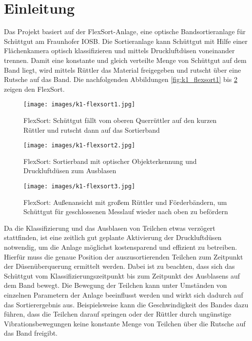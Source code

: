 \section{Einleitung}

Das Projekt basiert auf der FlexSort-Anlage, eine optische Bandsortieranlage für Schüttgut am Fraunhofer IOSB. Die Sortieranlage kann Schüttgut mit Hilfe einer Flächenkamera optisch klassifizieren und mittels Druckluftdüsen voneinander trennen. Damit eine konstante und gleich verteilte Menge von Schüttgut auf dem Band liegt, wird mittels Rüttler das Material freigegeben und rutscht über eine Rutsche auf das Band. Die nachfolgenden Abbildungen \ref{fig:k1_flexsort1} bis \ref{fig:k1_flexsort3} zeigen den FlexSort.

\begin{figure}[htb]
	\centering
	\begin{minipage}[t]{0.4\linewidth}
		\centering
		\texttt{[image: images/k1-flexsort1.jpg]}
		\caption{FlexSort: Schüttgut fällt vom oberen Querrüttler auf den kurzen Rüttler und rutscht dann auf das Sortierband}
		\label{fig:k1_flexsort1}
	\end{minipage}%
	\hfill
	\begin{minipage}[t]{0.54\linewidth}
		\centering
		\texttt{[image: images/k1-flexsort2.jpg]}
		\caption{FlexSort: Sortierband mit optischer Objekterkennung und Druckluftdüsen zum Ausblasen}
		\label{fig:k1_flexsort2}
	\end{minipage}
\end{figure}

\begin{figure}[htb]
	\centering
	\texttt{[image: images/k1-flexsort3.jpg]}
	\caption{FlexSort: Außenansicht mit großem Rüttler und Förderbändern, um Schüttgut für geschlossenen Messlauf wieder nach oben zu befördern}
	\label{fig:k1_flexsort3}
\end{figure}
 
Da die Klassifizierung und das Ausblasen von Teilchen etwas verzögert stattfinden, ist eine zeitlich gut geplante Aktivierung der Druckluftdüsen notwendig, um die Anlage möglichst kostensparend und effizient zu betreiben. Hierfür muss die genaue Position der auszusortierenden Teilchen zum Zeitpunkt der Düsenüberquerung ermittelt werden. Dabei ist zu beachten, dass sich das Schüttgut vom Klassifizierungszeitpunkt bis zum Zeitpunkt des Ausblasens auf dem Band bewegt. Die Bewegung der Teilchen kann unter Umständen von einzelnen Parametern der Anlage beeinflusst werden und wirkt sich dadurch auf das Sortierergebnis aus. Beispielsweise kann die Geschwindigkeit des Bandes dazu führen, dass die Teilchen darauf springen oder der Rüttler durch ungünstige Vibrationsbewegungen keine konstante Menge von Teilchen über die Rutsche auf das Band freigibt. 

